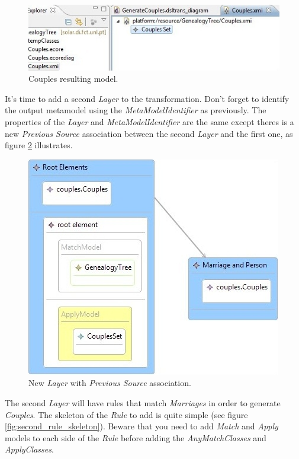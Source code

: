 \begin{figure}[h]
\begin{center}
  \includegraphics[scale=0.7]{imgs/couples_xmi_1.jpg}
  \caption{Couples resulting model.}
  \label{fig:couples_xmi_1}
\end{center}
\end{figure}


It's time to add a second \emph{Layer} to the transformation. Don't forget to
identify the output metamodel using the \emph{MetaModelIdentifier} as
previously. The properties of the \emph{Layer} and \emph{MetaModelIdentifier}
are the same except theres is a new \emph{Previous Source} association between
the second \emph{Layer} and the first one, as figure
\ref{fig:second_layer_empty} illustrates.

\begin{figure}[h]
\begin{center}
  \includegraphics[scale=0.7]{imgs/second_layer_empty.jpg}
  \caption{New \emph{Layer} with \emph{Previous Source} association.}
  \label{fig:second_layer_empty}
\end{center}
\end{figure}

The second \emph{Layer} will have rules that match \emph{Marriages} in order to
generate \emph{Couples}. The skeleton of the \emph{Rule} to add is quite simple
(see figure \ref{fig:second_rule_skeleton}). Beware that you need to add
\emph{Match} and \emph{Apply} models to each side of the \emph{Rule} before
adding the \emph{AnyMatchClasses} and \emph{ApplyClasses}.

